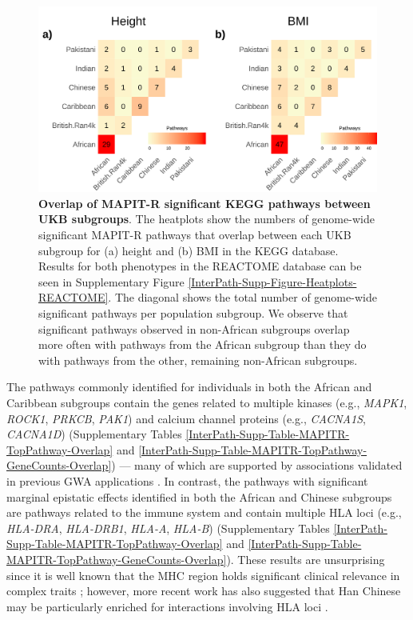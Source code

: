 \documentclass[10pt,a4paper]{article}
\begin{document}
\begin{figure}[htb]
\centering
\includegraphics[scale=.225]{Images/Main/InterPath_Main_Figure_Heatplots_KEGG_vs4.png}
\caption[TBD]{\textbf{Overlap of MAPIT-R significant KEGG pathways between UKB subgroups}. The heatplots show the numbers of genome-wide significant MAPIT-R pathways that overlap between each UKB subgroup for (a) height and (b) BMI in the KEGG database. Results for both phenotypes in the REACTOME database can be seen in Supplementary Figure \ref{InterPath-Supp-Figure-Heatplots-REACTOME}. The diagonal shows the total number of genome-wide significant pathways per population subgroup. We observe that significant pathways observed in non-African subgroups overlap more often with pathways from the African subgroup than they do with pathways from the other, remaining non-African subgroups.}
\label{InterPath-Main-Figure-Heatplots-KEGG}
\end{figure}

The pathways commonly identified for individuals in both the African and Caribbean subgroups contain the genes related to multiple kinases (e.g., \textit{MAPK1}, \textit{ROCK1}, \textit{PRKCB}, \textit{PAK1}) and calcium channel proteins (e.g., \textit{CACNA1S}, \textit{CACNA1D}) (Supplementary Tables \ref{InterPath-Supp-Table-MAPITR-TopPathway-Overlap} and \ref{InterPath-Supp-Table-MAPITR-TopPathway-GeneCounts-Overlap}) --- many of which are supported by associations validated in previous GWA applications \cite{Cousminer:2013aa,Wood:2014aa}. In contrast, the pathways with significant marginal epistatic effects identified in both the African and Chinese subgroups are pathways related to the immune system and contain multiple HLA loci (e.g., \textit{HLA-DRA}, \textit{HLA-DRB1}, \textit{HLA-A}, \textit{HLA-B}) (Supplementary Tables \ref{InterPath-Supp-Table-MAPITR-TopPathway-Overlap} and \ref{InterPath-Supp-Table-MAPITR-TopPathway-GeneCounts-Overlap}). These results are unsurprising since it is well known that the MHC region holds significant clinical relevance in complex traits \cite{Wan2010,Rose2012,Stahl:2012aa,Crawford:2018aa}; however, more recent work has also suggested that Han Chinese may be particularly enriched for interactions involving HLA loci \cite{Deng2020}. 
\end{document}
